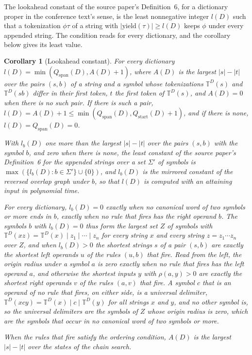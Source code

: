 \documentclass[11pt,a4paper]{article}
\theoremstyle{definition}
\theoremstyle{plain}
\newtheorem{corollary}{Corollary}
\newcommand{\T}{\mathbb{T}}
\newcommand{\yield}{\mathrm{yield}}
\begin{document}
The lookahead constant of the source paper's Definition~6, for a dictionary proper in the conference text's sense, is
the least nonnegative integer \(l(D)\) such that a tokenization \(\phi\tau\) of a string with
\(|\yield(\tau)| \ge l(D)\) keeps \(\phi\) under every appended string. The condition reads for every dictionary, and
the corollary below gives its least value.

\begin{corollary}[Lookahead constant]\label{cor:lookconst}
For every dictionary \(l(D) = \min(Q_{\mathrm{span}}(D), A(D) + 1)\), where \(A(D)\) is the largest \(|s| - |t|\) over
the pairs \((s, b)\) of a string and a symbol whose tokenizations \(\T^D(s)\) and \(\T^D(sb)\) differ in their first
token, \(t\) the first token of \(\T^D(s)\), and \(A(D) = 0\) when there is no such pair. If there is such a pair,
\(l(D) = A(D) + 1 \le \min(Q_{\mathrm{span}}(D), Q_{\mathrm{start}}(D) + 1)\), and if there is none,
\(l(D) = Q_{\mathrm{span}}(D) = 0\).

With \(l_b(D)\) one more than the largest \(|s| - |t|\) over the pairs \((s, b)\) with the symbol \(b\), and zero when
there is none, the least constant of the source paper's Definition~6 for the appended strings over a set \(\Sigma'\) of
symbols is \(\max(\{l_b(D) : b \in \Sigma'\} \cup \{0\})\), and \(l_b(D)\) is the mirrored constant of the reversed
overlap graph under \(b\), so that \(l(D)\) is computed with an attaining input in polynomial time.

For every dictionary, \(l_b(D) = 0\) exactly when no canonical word of two symbols or more ends in \(b\), exactly when
no rule that fires has the right operand \(b\). The symbols \(b\) with \(l_b(D) = 0\) thus form the largest set \(Z\) of
symbols with \(\T^D(xz) = \T^D(x) \mid z_1 \mid \cdots \mid z_n\) for every string \(x\) and every string
\(z = z_1 \cdots z_n\) over \(Z\), and when \(l_b(D) > 0\) the shortest strings \(s\) of a pair \((s, b)\) are exactly
the shortest left operands \(u\) of the rules \((u, b)\) that fire. Read from the left, the origin radius under a symbol
\(a\) is zero exactly when no rule that fires has the left operand \(a\), and otherwise the shortest inputs \(y\) with
\(\rho(a, y) > 0\) are exactly the shortest right operands \(v\) of the rules \((a, v)\) that fire. A symbol \(c\) that
is an operand of no rule that fires, on either side, is a universal delimiter,
\(\T^D(xcy) = \T^D(x) \mid c \mid \T^D(y)\) for all strings \(x\) and \(y\), and no other symbol is, so the universal
delimiters are the symbols of \(Z\) whose origin radius is zero, which are the symbols that occur in no canonical word
of two symbols or more.

When the rules that fire satisfy the ordering condition, \(A(D)\) is the largest \(|s| - |t|\) over the states of the
chain search.
\end{corollary}
\end{document}
